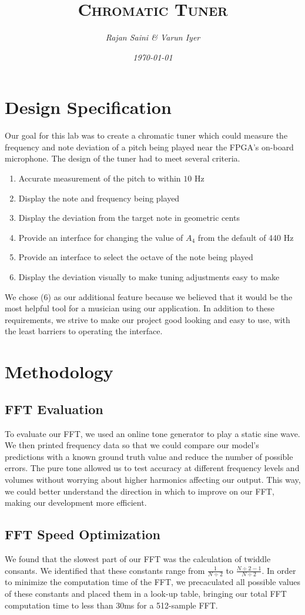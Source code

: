 \documentclass{article}
\title{\textsc{Chromatic Tuner}}
\author{\textit{Rajan Saini \& Varun Iyer}}
\date{\textit{\today}}
\begin{document}
\maketitle
\section{Design Specification}
Our goal for this lab was to create a chromatic tuner which could measure the frequency and note deviation of a pitch being played near the FPGA’s on-board microphone. The design of the tuner had to meet several criteria.
\begin{enumerate}
	\item Accurate measurement of the pitch to within $10$ Hz
	\item Display the note and frequency being played
	\item Display the deviation from the target note in geometric cents
	\item Provide an interface for changing the value of $A_4$ from the default of 440 Hz
	\item Provide an interface to select the octave of the note being played
	\item Display the deviation visually to make tuning adjustments easy to make
\end{enumerate}
	We chose (6) as our additional feature because we believed that it would be the most helpful tool for a musician using our application.
	In addition to these requirements, we strive to make our project good looking and easy to use, with the least barriers to operating the interface.
\section{Methodology}
\subsection{FFT Evaluation}
To evaluate our FFT, we used an online tone generator to play a static sine wave. We then printed frequency data so that we could compare our model's predictions with a known ground truth value and reduce the number of possible errors. The pure tone allowed us to test accuracy at different frequency levels and volumes without worrying about higher harmonics affecting our output. This way, we could better understand the direction in which to improve on our FFT, making our development more efficient. \par
\subsection{FFT Speed Optimization}
	We found that the slowest part of our FFT was the calculation of twiddle consants.
We identified that these constants range from $\tfrac{1}{N\div 2}$ to $\tfrac{N\div 2 - 1}{N\div 2}$.
In order to minimize the computation time of the FFT, we precaculated all possible values of these constants and placed them in a look-up table, bringing our total FFT computation time to less than 30ms for a 512-sample FFT. \par
\end{document}
